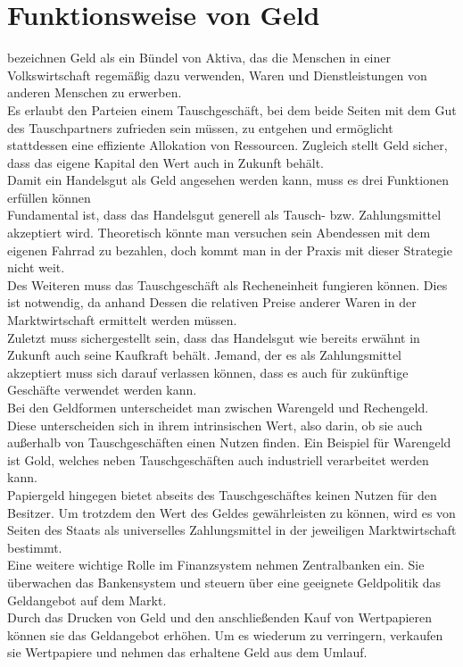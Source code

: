 \section{Funktionsweise von Geld}
\cite{mankiw_taylor_2018} bezeichnen Geld als ein Bündel von Aktiva, das die Menschen in einer Volkswirtschaft regemäßig dazu verwenden, Waren und Dienstleistungen von anderen Menschen zu erwerben.\\
Es erlaubt den Parteien einem Tauschgeschäft, bei dem beide Seiten mit dem Gut des Tauschpartners zufrieden sein müssen, zu entgehen und ermöglicht stattdessen eine effiziente Allokation von Ressourcen. Zugleich stellt Geld sicher, dass das eigene Kapital den Wert auch in Zukunft behält.\\
Damit ein Handelsgut als Geld angesehen werden kann, muss es drei Funktionen erfüllen können\\
Fundamental ist, dass das Handelsgut generell als Tausch- bzw. Zahlungsmittel akzeptiert wird. Theoretisch könnte man versuchen sein Abendessen mit dem eigenen Fahrrad zu bezahlen, doch kommt man in der Praxis mit dieser Strategie nicht weit.\\
Des Weiteren muss das Tauschgeschäft als Recheneinheit fungieren können. Dies ist notwendig, da anhand Dessen die relativen Preise anderer Waren in der Marktwirtschaft ermittelt werden müssen.\\
Zuletzt muss sichergestellt sein, dass das Handelsgut wie bereits erwähnt in Zukunft auch seine Kaufkraft behält. Jemand, der es als Zahlungsmittel akzeptiert muss sich darauf verlassen können, dass es auch für zukünftige Geschäfte verwendet werden kann.\\
Bei den Geldformen unterscheidet man zwischen Warengeld und Rechengeld. Diese unterscheiden sich in ihrem intrinsischen Wert, also darin, ob sie auch außerhalb von Tauschgeschäften einen Nutzen finden. Ein Beispiel für Warengeld ist Gold, welches neben Tauschgeschäften auch industriell verarbeitet werden kann.\\
Papiergeld hingegen bietet abseits des Tauschgeschäftes keinen Nutzen für den Besitzer. Um trotzdem den Wert des Geldes gewährleisten zu können, wird es von Seiten des Staats als universelles Zahlungsmittel in der jeweiligen Marktwirtschaft bestimmt.\\
Eine weitere wichtige Rolle im Finanzsystem nehmen Zentralbanken ein. Sie überwachen das Bankensystem und steuern über eine geeignete Geldpolitik das Geldangebot auf dem Markt.\\
Durch das Drucken von Geld und den anschließenden Kauf von Wertpapieren können sie das Geldangebot erhöhen. Um es wiederum zu verringern, verkaufen sie Wertpapiere und nehmen das erhaltene Geld aus dem Umlauf.\\

